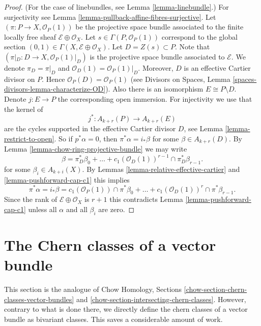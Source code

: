 \begin{proof}
(For the case of linebundles, see Lemma \ref{lemma-linebundle}.)
For surjectivity see Lemma \ref{lemma-pullback-affine-fibres-surjective}.
Let $(\pi  : P \to X, \mathcal{O}_P(1))$
be the projective space bundle associated
to the finite locally free sheaf $\mathcal{E} \oplus \mathcal{O}_X$.
Let $s \in \Gamma(P, \mathcal{O}_P(1))$ correspond to the global
section $(0, 1) \in \Gamma(X, \mathcal{E} \oplus \mathcal{O}_X)$.
Let $D = Z(s) \subset P$. Note that
$(\pi|_D : D \to X , \mathcal{O}_P(1)|_D)$
is the projective space bundle associated
to $\mathcal{E}$. We denote $\pi_D = \pi|_D$ and
$\mathcal{O}_D(1) = \mathcal{O}_P(1)|_D$.
Moreover, $D$ is an effective
Cartier divisor on $P$. Hence $\mathcal{O}_P(D) = \mathcal{O}_P(1)$
(see Divisors on Spaces, Lemma \ref{spaces-divisors-lemma-characterize-OD}).
Also there is an isomorphism
$E \cong P \setminus D$. Denote $j : E \to P$ the
corresponding open immersion.
For injectivity we use that the kernel of
$$
j^* :
A_{k + r}(P)
\longrightarrow
A_{k + r}(E)
$$
are the cycles supported in the effective Cartier divisor $D$,
see Lemma \ref{lemma-restrict-to-open}. So if $p^*\alpha = 0$, then
$\pi^*\alpha = i_*\beta$ for some $\beta \in A_{k + r}(D)$.
By Lemma \ref{lemma-chow-ring-projective-bundle} we may write
$$
\beta = \pi_D^*\beta_0 +
\ldots + c_1(\mathcal{O}_D(1))^{r - 1} \cap \pi_D^* \beta_{r - 1}.
$$
for some $\beta_i \in A_{k + i}(X)$.
By Lemmas \ref{lemma-relative-effective-cartier}
and \ref{lemma-pushforward-cap-c1}
this implies
$$
\pi^*\alpha = i_*\beta =
c_1(\mathcal{O}_P(1)) \cap \pi^*\beta_0 +
\ldots +
c_1(\mathcal{O}_D(1))^r \cap \pi^*\beta_{r - 1}.
$$
Since the rank of $\mathcal{E} \oplus \mathcal{O}_X$ is $r + 1$
this contradicts Lemma \ref{lemma-pushforward-cap-c1} unless all
$\alpha$ and all $\beta_i$ are zero.
\end{proof}








\section{The Chern classes of a vector bundle}
\label{section-chern-classes-vector-bundles}

\noindent
This section is the analogue of Chow Homology, Sections
\ref{chow-section-chern-classes-vector-bundles} and
\ref{chow-section-intersecting-chern-classes}.
However, contrary to what is done there, we directly
define the chern classes of a vector bundle as bivariant classes.
This saves a considerable amount of work.

